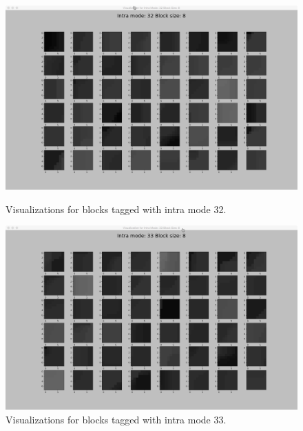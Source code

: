 \begin{figure}
        \vspace*{1cm} %
    
        \begin{minipage}{0.49\textwidth}
            \includegraphics[width=\linewidth]{Figures/visu-size8x8/8-32}
            \caption[Visualizations for blocks tagged with intra mode 32]{Visualizations for blocks tagged with intra mode 32.}
            \label{fig:size8_mode32}
        \end{minipage}
        \hspace{\fill} %
        \begin{minipage}{0.49\textwidth}
            \includegraphics[width=\linewidth]{Figures/visu-size8x8/8-33}
            \caption[Visualizations for blocks tagged with intra mode 33]{Visualizations for blocks tagged with intra mode 33.}
            \label{fig:size8_mode33}
        \end{minipage}
    \end{figure}
